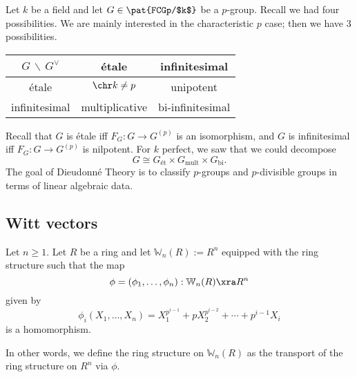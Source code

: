 
Let $k$ be a field and let $G\in \pat{FCGp/$k$}$ be a $p$-group. Recall we had four possibilities. We are mainly interested in the characteristic $p$ case; then we have 3 possibilities.

\begin{center}
\begin{tabular}{|c|c|c|}
\hline 
$G\,\backslash\, G^{\vee}$  & \'etale & infinitesimal\tabularnewline
\hline 
\'etale & $\chr k\ne p$ & unipotent\tabularnewline
\hline 
infinitesimal & multiplicative & bi-infinitesimal\tabularnewline
\hline 
\end{tabular}
\end{center}

Recall that $G$ is \'etale iff $F_G:G\to G^{(p)}$ is an isomorphism, and $G$ is infinitesimal iff $F_G:G\to G^{(p)}$ is nilpotent. For $k$ perfect, we saw that we could decompose
\[
G\cong G_{\text{\'et}}\times G_{\text{mult}}\times G_{\text{bi}}.
\]
The goal of Dieudonn\'e Theory is to classify $p$-groups and $p$-divisible groups in terms of linear algebraic data. 

\subsection{Witt vectors}
\begin{df}
Let $n\ge 1$. Let $R$ be a ring and let $\mathbb W_n(R):=R^n$ equipped with the ring structure such that the map 
\[
\phi=(\phi_1,\ldots, \phi_n):\mathbb W_n(R)\xra R^n
\]
given by 
\[
\phi_i(X_1,\ldots, X_n)=X_1^{p^{i-1}}+pX_2^{p^{i-2}}+\cdots +p^{i-1}X_i
\]
is a homomorphism. %
\end{df}
In other words, we define the ring structure on $\mathbb W_n(R)$ as the transport of the ring structure on $R^n$ via $\phi$.

